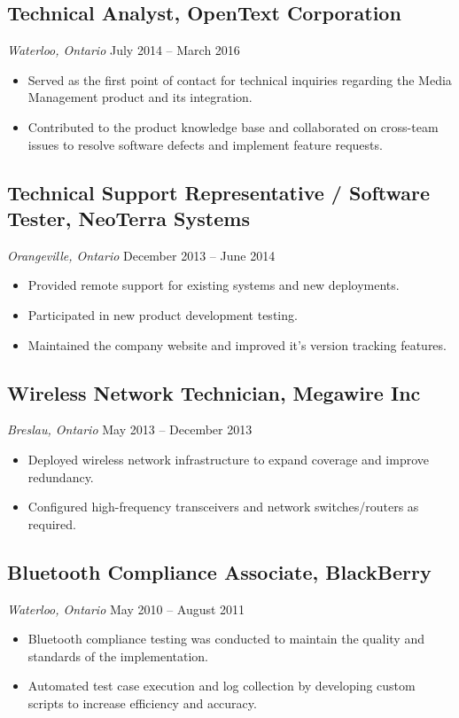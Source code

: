 \documentclass[a4paper,11pt]{article}  %
\begin{document}
\subsection*{Technical Analyst, OpenText Corporation}
\textit{Waterloo, Ontario} \hfill July 2014 -- March 2016
\begin{itemize}
    \item Served as the first point of contact for technical inquiries regarding the Media Management product and its integration.
    \item Contributed to the product knowledge base and collaborated on cross-team issues to resolve software defects and implement feature requests.
\end{itemize}

\subsection*{Technical Support Representative / Software Tester, NeoTerra Systems}
\textit{Orangeville, Ontario} \hfill December 2013 -- June 2014
\begin{itemize}
    \item Provided remote support for existing systems and new deployments.
    \item Participated in new product development testing.  
    \item Maintained the company website and improved it's version tracking features.
\end{itemize}

\subsection*{Wireless Network Technician, Megawire Inc}
\textit{Breslau, Ontario} \hfill May 2013 -- December 2013
\begin{itemize}
    \item Deployed wireless network infrastructure to expand coverage and improve redundancy. 
    \item Configured high-frequency transceivers and network switches/routers as required.
\end{itemize}

\subsection*{Bluetooth Compliance Associate, BlackBerry}
\textit{Waterloo, Ontario} \hfill May 2010 -- August 2011
\begin{itemize}
    \item Bluetooth compliance testing was conducted to maintain the quality and standards of the implementation.
    \item Automated test case execution and log collection by developing custom scripts to increase efficiency and accuracy.
\end{itemize}
\end{document}
